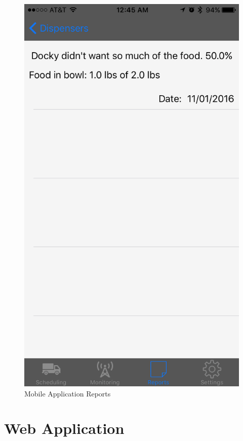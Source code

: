 \documentclass[12pt]{article}
\begin{document}
\begin{appendix}
  \begin{figure}[!htb]
    \begin{center}
        \includegraphics[scale=0.15]{Figures/iOSApp5.png}
    \end{center}
    \caption{Mobile Application Reports}
    \label{fig:iOSApp5}
  \end{figure}

  \section{Web Application} \label{App:WebApplication}

\end{appendix}
\newpage

\end{document}
